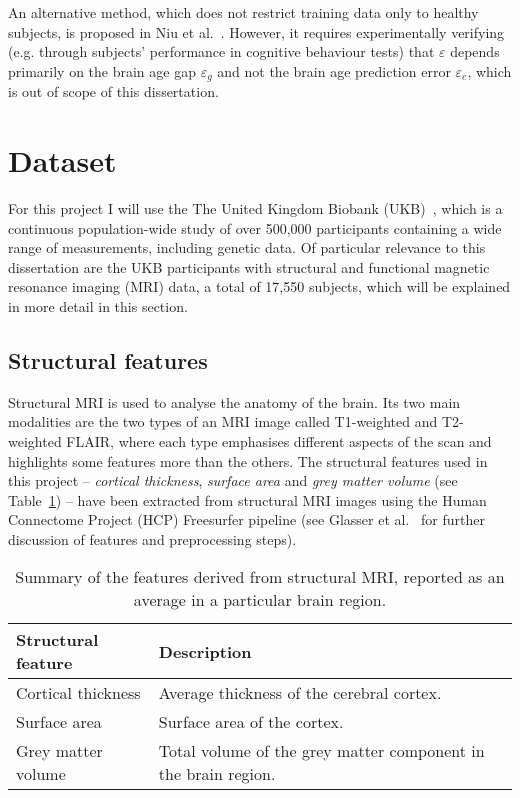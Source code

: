 An alternative method, which does not restrict training data only to healthy subjects, is proposed in Niu et al.~\cite{niu2019improved}. However, it requires experimentally verifying (e.g. through subjects' performance in cognitive behaviour tests) that $\varepsilon$ depends primarily on the brain age gap $\varepsilon_g$ and not the brain age prediction error $\varepsilon_e$, which is out of scope of this dissertation.

\section{Dataset}
\label{dataset}

For this project I will use the The United Kingdom Biobank (UKB)~\cite{sudlow2015uk}, which is a continuous population-wide study of over 500,000 participants containing a wide range of measurements, including genetic data. Of particular relevance to this dissertation are the UKB participants with structural and functional magnetic resonance imaging (MRI) data, a total of 17,550 subjects, which will be explained in more detail in this section. 

\subsection{Structural features}

Structural MRI is used to analyse the anatomy of the brain. Its two main modalities are the two types of an MRI image called T1-weighted and T2-weighted FLAIR, where each type emphasises different aspects of the scan and highlights some features more than the others. The structural features used in this project – \textit{cortical thickness}, \textit{surface area} and \textit{grey matter volume} (see Table~\ref{table:structural-features}) – have been extracted from structural MRI images using the Human Connectome Project (HCP) Freesurfer pipeline (see Glasser et al.~\cite{glasser2013minimal} for further discussion of features and preprocessing steps). 

\begin{table}[]
    \caption{Summary of the features derived from structural MRI, reported as an average in a particular brain region.}\label{table:structural-features}
    \centering
    \begin{tabular}{lp{11cm}}
        \hline
    \textbf{Structural feature}            & \textbf{Description} \\ \hline
    Cortical thickness &  Average thickness of the cerebral cortex. \\
    Surface area       &  Surface area of the cortex. \\
    Grey matter volume &  Total volume of the grey matter component in the brain region.
    \end{tabular}
\end{table}


